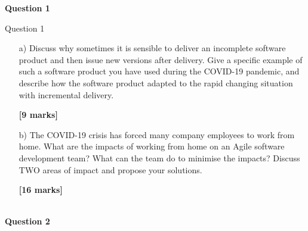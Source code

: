 \documentclass[11pt]{article}
\begin{document}
	\pagestyle{fancy}
	\fancyhf{}
	
	\setcounter{page}{1}
	
	
        \textbf{Question 1}

        Question 1
        \begin{enumerate}
            
        \item[a) ]Discuss why sometimes it is sensible to deliver an incomplete software product and then issue new versions after delivery. Give a specific example of such a software product you have used during the COVID-19 pandemic, and describe how the software product adapted to the rapid changing situation with incremental delivery.
        \begin{flushright}
            \textbf{[9 marks]}
        \end{flushright}
    
        \item[b) ]The COVID-19 crisis has forced many company employees to work from home. What are the impacts of working from home on an Agile software development team? What can the team do to minimise the impacts? Discuss TWO areas of impact and propose your solutions.
        \begin{flushright}
            \textbf{[16 marks]}
        \end{flushright}
    
        \end{enumerate}
        ~\\
    
        \textbf{Question 2}
\end{document}
